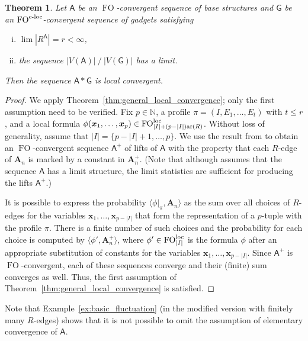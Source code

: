 \documentclass[11pt]{article}
\theoremstyle{plain}
\newtheorem{theorem}{Theorem}[section]
\theoremstyle{definition}
\theoremstyle{remark}
\DeclareMathOperator\aritysym{ar}
\newcommand{\arity}[1]{{\aritysym({#1})}}
\newcommand{\N}{\mathbb{N}}
\DeclareMathOperator\FO{FO}
\newcommand{\FOloc}[1]{\FO_{#1}^\textnormal{loc}}
\newcommand{\FOcloc}[1]{\FO_{#1}^{\textnormal{c-loc}}}
\newcommand{\stonepar}[2]{\langle #1, #2 \rangle}
\newcommand{\str}[1]{\mathbf{#1}}
\newcommand{\strseq}[1]{{\boldsymbol{\mathsf{#1}}}}
\newcommand{\tpl}[1]{{\bm{#1}}}
\begin{document}
\begin{theorem}\label{thm:fo_finitely_many_r_edges}
    Let $\strseq{A}$ be an $\FO$-convergent sequence of base structures and $\strseq{G}$ be an $\FOcloc{}$-convergent sequence of gadgets satisfying
    \begin{enumerate}[(i)]
         \item $\lim |R^\strseq{A}| = r < \infty$,
         \item the sequence $|V(\strseq{A})|\:/\:|V(\strseq{G})|$ has a limit.
    \end{enumerate}
    Then the sequence $\strseq{A}*\strseq{G}$ is local convergent.
\end{theorem}
\begin{proof}
    We apply Theorem~\ref{thm:general_local_convergence}; only the first assumption need to be verified.    
    Fix $p \in \N$, a profile $\pi = (I,E_1, \dots, E_t)$ with $t \leq r$, and a local formula $\phi(\tpl{x}_1, \dots, \tpl{x}_p) \in \FOloc{|I|+(p-|I|)\arity{R}}$.
    Without loss of generality, assume that $|I| = \{ p-|I| + 1, \dots, p \}$.
    We use the result from \cite{rooting_algebraic_vertices} to obtain an $\FO$-convergent sequence $\strseq{A}^+$ of lifts of $\strseq{A}$ with the property that each $R$-edge of $\str{A}_n$ is marked by a constant in $\str{A}_n^+$.
    (Note that although \cite{rooting_algebraic_vertices} assumes that the sequence $\strseq{A}$ has a limit structure, the limit statistics are sufficient for producing the lifts $\strseq{A}^+$.)
    
    It is possible to express the probability $\stonepar{\phi|_\pi}{\str{A}_n}$ as the sum over all choices of $R$-edges for the variables $\tpl{x}_1, \dots, \tpl{x}_{p-|I|}$ that form the representation of a $p$-tuple with the profile $\pi$.
    There is a finite number of such choices and the probability for each choice is computed by $\stonepar{\phi'}{\str{A}_n^+}$, where $\phi' \in \FOloc{|I|}$ is the formula $\phi$ after an appropriate substitution of constants for the variables $\tpl{x}_1, \dots, \tpl{x}_{p-|I|}$.
    Since $\strseq{A}^+$ is $\FO$-convergent, each of these sequences converge and their (finite) sum converges as well.
    Thus, the first assumption of Theorem~\ref{thm:general_local_convergence} is satisfied.
\end{proof}

Note that Example~\ref{ex:basic_fluctuation} (in the modified version with finitely many $R$-edges) shows that it is not possible to omit the assumption of elementary convergence of $\strseq{A}$.
\end{document}
